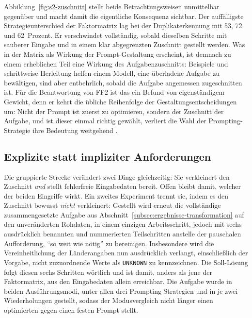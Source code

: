 Abbildung~\ref{fig:s2-zuschnitt} stellt beide Betrachtungsweisen unmittelbar gegenüber und macht damit die eigentliche Konsequenz sichtbar. Der auffälligste Strategieunterschied der Faktormatrix lag bei der Duplikaterkennung mit 53, 72 und 62~Prozent. Er verschwindet vollständig, sobald dieselben Schritte mit sauberer Eingabe und in einem klar abgegrenzten Zuschnitt gestellt werden. Was in der Matrix als Wirkung der Prompt-Gestaltung erscheint, ist demnach zu einem erheblichen Teil eine Wirkung des Aufgabenzuschnitts: Beispiele und schrittweise Herleitung helfen einem Modell, eine überladene Aufgabe zu bewältigen, sind aber entbehrlich, sobald die Aufgabe angemessen zugeschnitten ist. Für die Beantwortung von FF2 ist das ein Befund von eigenständigem Gewicht, denn er kehrt die übliche Reihenfolge der Gestaltungsentscheidungen um: Nicht der Prompt ist zuerst zu optimieren, sondern der Zuschnitt der Aufgabe, und ist dieser einmal richtig gewählt, verliert die Wahl der Prompting-Strategie ihre Bedeutung weitgehend \autocite{khanOverviewETLTechniques2024,schulhoffPromptReportSystematic2025}.

\subsection{Explizite statt impliziter Anforderungen}
\label{subsec:komposition}

Die gruppierte Strecke verändert zwei Dinge gleichzeitig: Sie verkleinert den Zuschnitt \emph{und} stellt fehlerfreie Eingabedaten bereit. Offen bleibt damit, welcher der beiden Eingriffe wirkt. Ein zweites Experiment trennt sie, indem es den Zuschnitt bewusst \emph{nicht} verkleinert: Gestellt wird erneut die vollständige zusammengesetzte Aufgabe aus Abschnitt~\ref{subsec:ergebnisse-transformation} auf den unveränderten Rohdaten, in einem einzigen Arbeitsschritt, jedoch mit sechs ausdrücklich benannten und nummerierten Teilschritten anstelle der pauschalen Aufforderung, \enquote{so weit wie nötig} zu bereinigen. Insbesondere wird die Vereinheitlichung der Länderangaben nun ausdrücklich verlangt, einschließlich der Vorgabe, nicht zuzuordnende Werte als \texttt{UNKNOWN} zu kennzeichnen. Die Soll-Lösung folgt diesen sechs Schritten wörtlich und ist damit, anders als jene der Faktormatrix, aus den Eingabedaten allein erreichbar. Die Aufgabe wurde in beiden Ausführungsmodi, unter allen drei Prompting-Strategien und in je zwei Wiederholungen gestellt, sodass der Modusvergleich nicht länger einen optimierten gegen einen festen Prompt stellt.

